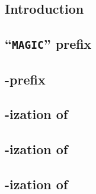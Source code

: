 \subsection{Introduction}                        \label{rlp auth: rlp utils calls: intro}    
\subsection{``\texttt{MAGIC}'' prefix}           \label{rlp auth: rlp utils calls: magic}    
\subsection{\rlp{}-prefix}                       \label{rlp auth: rlp utils calls: prefix}   
\subsection{\rlp{}-ization of \locChainId{}}     \label{rlp auth: rlp utils calls: chain id} 
\subsection{\rlp{}-ization of \locAddress{}}     \label{rlp auth: rlp utils calls: address}  
\subsection{\rlp{}-ization of \locNonce{}}       \label{rlp auth: rlp utils calls: nonce}    
